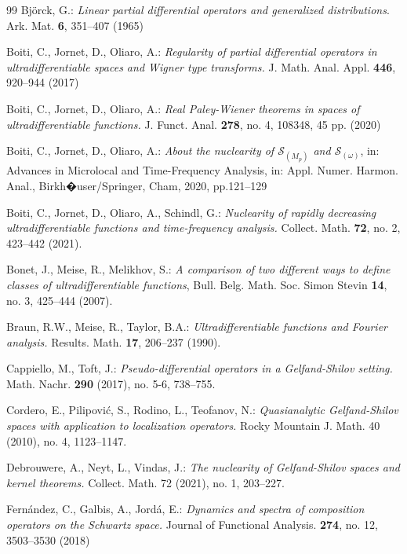 \documentclass[12pt,reqno]{amsart} %
\numberwithin{equation}{section}
\begin{document}
\begin{thebibliography}{99}
					 Bj\"orck, G.:\emph{ Linear partial differential operators and generalized distributions}. Ark. Mat. {\bf 6}, 351--407 (1965)
					
					  Boiti, C., Jornet, D.,   Oliaro, A.: \emph{Regularity of partial differential operators in ultradifferentiable spaces and Wigner type transforms.} J. Math. Anal. Appl. {\bf 446}, 920--944 (2017)
					
					  Boiti, C.,  Jornet, D., Oliaro, A.:  \emph{Real Paley-Wiener theorems in spaces of ultradifferentiable functions.} J. Funct. Anal. {\bf 278}, no. 4, 108348, 45 pp. (2020)
					
					 Boiti, C.,   Jornet, D.,   Oliaro, A.: \emph{About the nuclearity of $\mathcal{S}_{(M_p)}$ and $\mathcal{S}_{(\omega)}$}, in: Advances in Microlocal and Time-Frequency Analysis, in: Appl. Numer. Harmon. Anal., Birkh�user/Springer, Cham, 2020, pp.121--129
					
					 Boiti, C.,  Jornet, D.,  Oliaro,  A., Schindl, G.: \emph{Nuclearity of rapidly decreasing ultradifferentiable functions and time-frequency analysis.} Collect. Math. {\bf 72}, no. 2, 423--442 (2021).
					
					
					
					 Bonet, J.,   Meise, R.,  Melikhov, S.: \emph{A comparison of two different ways to define classes of ultradifferentiable functions}, Bull. Belg. Math. Soc. Simon Stevin {\bf 14}, no. 3, 425--444  (2007).
					
					 Braun, R.W., Meise, R., Taylor, B.A.: \emph{Ultradifferentiable functions and Fourier analysis.} Results. Math. {\bf 17}, 206--237 (1990).
					
					 Cappiello, M., Toft, J.: \emph{Pseudo-differential operators in a Gelfand-Shilov setting.} Math. Nachr. {\bf 290} (2017), no. 5-6, 738--755.
					
					 Cordero, E., Pilipovi\'c, S., Rodino, L., Teofanov, N.: \emph{Quasianalytic Gelfand-Shilov spaces with application to localization operators.} Rocky Mountain J. Math. 40 (2010), no. 4, 1123--1147.
					
					 Debrouwere, A., Neyt, L., Vindas, J.: \emph{The nuclearity of Gelfand-Shilov spaces and kernel theorems.} Collect. Math. 72 (2021), no. 1, 203--227.
					
					
					  Fern\'andez, C.,   Galbis, A.,  Jord\'a,  E.: \emph{Dynamics and spectra of composition operators on the Schwartz space.} Journal of Functional Analysis. {\bf 274}, no. 12, 3503--3530 (2018)
					

\end{thebibliography}
\end{document}
